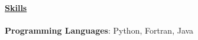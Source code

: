 \documentclass[letterpaper]{article}
\begin{document}
{\large \textbf{\underline{Skills}}}\\
\vspace{-0.1in}\\
\textbf{Programming Languages}: Python, Fortran, Java\\
\vspace{-0.08in}

\end{document}
